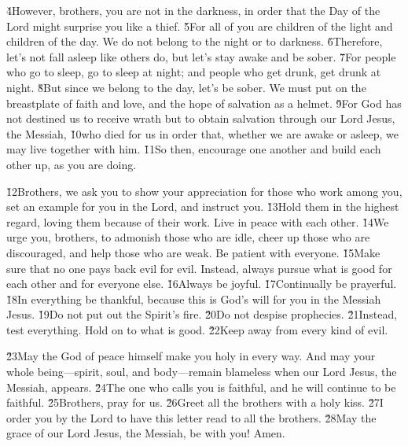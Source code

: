 \v{4}However, brothers, you are not in the darkness, in order that the Day of the Lord might surprise you like a thief. \v{5}For all of you are children of the light and children of the day. We do not belong to the night or to darkness. \v{6}Therefore, let's not fall asleep like others do, but let's stay awake and be sober. \v{7}For people who go to sleep, go to sleep at night; and people who get drunk, get drunk at night. \v{8}But since we belong to the day, let's be sober. We must put on the breastplate of faith and love, and the hope of salvation as a helmet. \v{9}For God has not destined us to receive wrath but to obtain salvation through our Lord Jesus, the Messiah, \v{10}who died for us in order that, whether we are awake or asleep, we may live together with him. \v{11}So then, encourage one another and build each other up, as you are doing.

\v{12}Brothers, we ask you to show your appreciation for those who work among you, set an example for you in the Lord, and instruct you. \v{13}Hold them in the highest regard, loving them because of their work. Live in peace with each other. \v{14}We urge you, brothers, to admonish those who are idle, cheer up those who are discouraged, and help those who are weak. Be patient with everyone. \v{15}Make sure that no one pays back evil for evil. Instead, always pursue what is good for each other and for everyone else. \v{16}Always be joyful. \v{17}Continually be prayerful. \v{18}In everything be thankful, because this is God's will for you in the Messiah Jesus. \v{19}Do not put out the Spirit's fire. \v{20}Do not despise prophecies. \v{21}Instead, test everything. Hold on to what is good. \v{22}Keep away from every kind of evil.

\v{23}May the God of peace himself make you holy in every way. And may your whole being---spirit, soul, and body---remain blameless when our Lord Jesus, the Messiah, appears. \v{24}The one who calls you is faithful, and he will continue to be faithful. \v{25}Brothers, pray for us. \v{26}Greet all the brothers with a holy kiss. \v{27}I order you by the Lord to have this letter read to all the brothers. \v{28}May the grace of our Lord Jesus, the Messiah, be with you! Amen.
